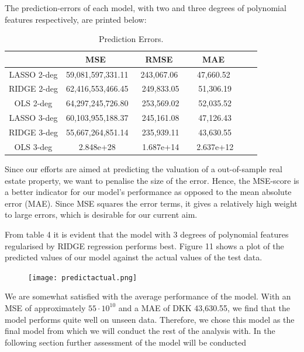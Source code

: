 \documentclass[12pt,a4paper]{article}
\begin{document}
The prediction-errors of each model, with two and three degrees of polynomial features respectively, are printed below:
\begin{table}[H]
\begin{center}
\caption{Prediction Errors. \label{time}}
\begin{tabular}{| c | c | c | c | c | c |} 
\hline
   & \ MSE \ & \, RMSE \ & \ MAE \ \\ \hline
   LASSO 2-deg & 59,081,597,331.11 & \ 243,067.06 \  & \ 47,660.52 \ \\ 
  RIDGE 2-deg & 62,416,553,466.45 & 249,833.05 & 51,306.19  \\ 
  OLS 2-deg & 64,297,245,726.80 & 253,569.02 & 52,035.52  \\ \hline 
  LASSO 3-deg & 60,103,955,188.37 & 245,161.08 & 47,126.43  \\ 
  RIDGE 3-deg & 55,667,264,851.14 & 235,939.11 & 43,630.55  \\ 
  OLS 3-deg & 2.848e+28 & 1.687e+14 & 2.637e+12  \\ \hline
\end{tabular}
\end{center}
\end{table}
Since our efforts are aimed at predicting the valuation of a out-of-sample real estate property, we want to penalise the size of the error. Hence, the MSE-score is a better indicator for our model's performance as opposed to the mean absolute error (MAE). Since MSE squares the error terms, it gives a relatively high weight to large errors, which is desirable for our current aim. 

From table 4 it is evident that the model with 3 degrees of polynomial features regularised by RIDGE regression performs best. Figure 11 shows a plot of the predicted values of our model against the actual values of the test data. 

\begin{figure}[H]
\centering
\caption{}
\texttt{[image: predictactual.png]}
\end{figure}
We are somewhat satisfied with the average performance of the model. With an MSE of approximately $55\cdot10^{10}$ and a MAE of DKK 43,630.55, we find that the model performs quite well on unseen data. Therefore, we chose this model as the final model from which we will conduct the rest of the analysis with. In the following section further assessment of the model will be conducted  \newline
\end{document}
